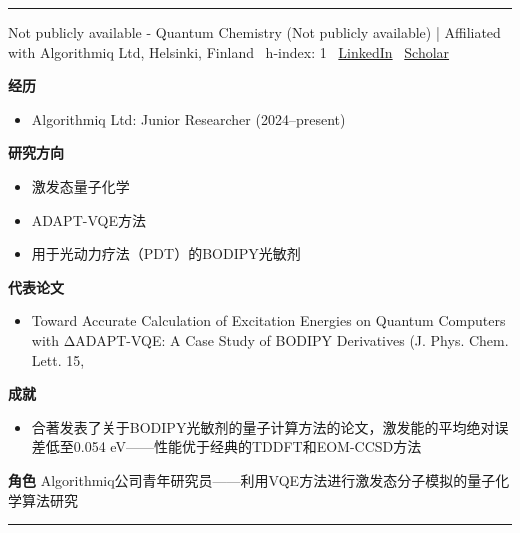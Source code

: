 \vspace{2pt}\hrule\vspace{2pt}
\vspace{4pt}
\par{\footnotesize\color{graytext}Not publicly available - Quantum Chemistry (Not publicly available) | Affiliated with Algorithmiq Ltd, Helsinki, Finland \textbar\  h-index: 1 \textbar\  \href{https://www.linkedin.com/in/leander-thiessen-9285a0113/}{LinkedIn} \textbar\  \href{Not publicly found (INSPIRE author ID: L.Thiessen.1 at https://inspirehep.net/authors/2924717)}{Scholar}}
\par{\footnotesize\color{mainred}\textbf{经历}}
\begin{itemize}[leftmargin=1.2em,itemsep=0pt,topsep=0pt]
\item {\footnotesize Algorithmiq Ltd: Junior Researcher (2024–present)}
\end{itemize}
\par{\footnotesize\color{mainred}\textbf{研究方向}}
\begin{itemize}[leftmargin=1.2em,itemsep=0pt,topsep=0pt]
\item {\footnotesize 激发态量子化学}
\item {\footnotesize ADAPT-VQE方法}
\item {\footnotesize 用于光动力疗法（PDT）的BODIPY光敏剂}
\end{itemize}
\par{\footnotesize\color{mainred}\textbf{代表论文}}
\begin{itemize}[leftmargin=1.2em,itemsep=0pt,topsep=0pt]
\item {\footnotesize Toward Accurate Calculation of Excitation Energies on Quantum Computers with ΔADAPT-VQE: A Case Study of BODIPY Derivatives (J. Phys. Chem. Lett. 15, }
\end{itemize}
\par{\footnotesize\color{mainred}\textbf{成就}}
\begin{itemize}[leftmargin=1.2em,itemsep=0pt,topsep=0pt]
\item {\footnotesize 合著发表了关于BODIPY光敏剂的量子计算方法的论文，激发能的平均绝对误差低至0.054 eV——性能优于经典的TDDFT和EOM-CCSD方法}
\end{itemize}
\par{\footnotesize\color{mainred}\textbf{角色}} {\footnotesize Algorithmiq公司青年研究员——利用VQE方法进行激发态分子模拟的量子化学算法研究}
\vspace{2pt}\hrule\vspace{2pt}
